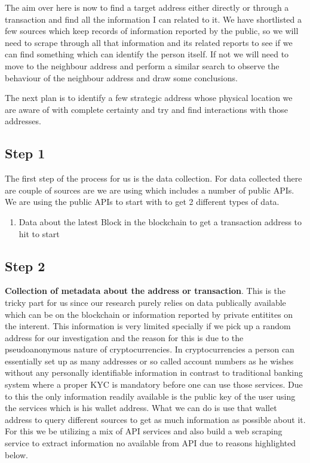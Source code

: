 \documentclass{article}
\begin{document}
    The aim over here is now to find a target address either directly or through a transaction and find all the information I can related to it. We have shortlisted a few sources which keep records of information reported by the public, so we will need to scrape through all that information and its related reports to see if we can find something which can identify the person itself. If not we will need to move to the neighbour address and perform a similar search to observe the behaviour of the neighbour address and draw some conclusions. 
    
    The next plan is to identify a few strategic address whose physical location we are aware of with complete certainty and try and find interactions with those addresses. 
    
    \subsection{Step 1}
        The first step of the process for us is the data collection. For data collected there are couple of sources are we are using which includes a number of public APIs. We are using the public APIs to start with to get 2 different types of data.
        \begin{enumerate}
            \item Data about the latest Block in the blockchain to get a transaction address to hit to start
        \end{enumerate}
        
    \subsection{Step 2}
        \textbf{Collection of metadata about the address or transaction}. 
        This is the tricky part for us since our research purely relies on data publically available which can be on the blockchain or information reported by private entitites on the interent. This information is very limited specially if we pick up a random address for our investigation and the reason for this is due to the pseudoanonymous nature of cryptocurrencies. In cryptocurrencies a person can essentially set up as many addresses or so called account numbers as he wishes without any personally identifiable information in contrast to traditional banking system where a proper KYC is mandatory before one can use those services. Due to this the only information readily available is the public key of the user using the services which is his wallet address. What we can do is use that wallet address to query different sources to get as much information as possible about it. For this we be utilizing a mix of API services and also build a web scraping service to extract information no available from API due to reasons highlighted below.
        
\end{document}

